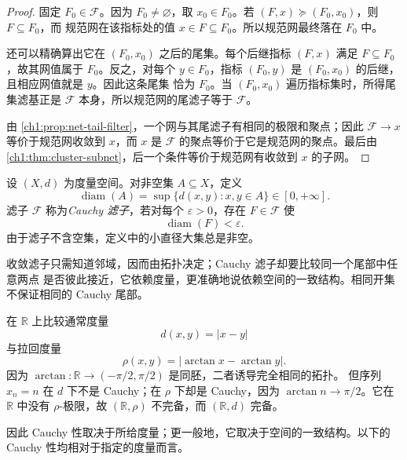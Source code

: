 \begin{proof}
固定 \(F_0\in\mathcal F\)。因为 \(F_0\neq\varnothing\)，取
\(x_0\in F_0\)。若 \((F,x)\succeq(F_0,x_0)\)，则 \(F\subseteq F_0\)，而
规范网在该指标处的值 \(x\in F\subseteq F_0\)。所以规范网最终落在
\(F_0\) 中。

还可以精确算出它在 \((F_0,x_0)\) 之后的尾集。每个后继指标 \((F,x)\) 满足
\(F\subseteq F_0\)，故其网值属于 \(F_0\)。反之，对每个 \(y\in F_0\)，指标
\((F_0,y)\) 是 \((F_0,x_0)\) 的后继，且相应网值就是 \(y\)。因此这条尾集
恰为 \(F_0\)。当 \((F_0,x_0)\) 遍历指标集时，所得尾集滤基正是
\(\mathcal F\) 本身，所以规范网的尾滤子等于 \(\mathcal F\)。

由 \cref{ch1:prop:net-tail-filter}，一个网与其尾滤子有相同的极限和聚点；因此
\(\mathcal F\to x\) 等价于规范网收敛到 \(x\)，而 \(x\) 是
\(\mathcal F\) 的聚点等价于它是规范网的聚点。最后由
\cref{ch1:thm:cluster-subnet}，后一个条件等价于规范网有收敛到 \(x\) 的子网。
\end{proof}

\begin{definition}
设 \((X,d)\) 为度量空间。对非空集 \(A\subseteq X\)，定义
\[
 \operatorname{diam}(A)=\sup\{d(x,y):x,y\in A\}\in[0,+\infty].
\]
滤子 \(\mathcal F\) 称为\emph{Cauchy 滤子}，若对每个
\(\varepsilon>0\)，存在 \(F\in\mathcal F\) 使
\[
 \operatorname{diam}(F)<\varepsilon.
\]
由于滤子不含空集，定义中的小直径大集总是非空。
\end{definition}

\begin{warningbox}[title={Cauchy 不是纯拓扑概念}]
收敛滤子只需知道邻域，因而由拓扑决定；Cauchy 滤子却要比较同一个尾部中任意两点
是否彼此接近，它依赖度量，更准确地说依赖空间的一致结构。相同开集不保证相同的
Cauchy 尾部。

在 $\mathbb R$ 上比较通常度量
\[
 d(x,y)=|x-y|
\]
与拉回度量
\[
 \rho(x,y)=|\arctan x-\arctan y|.
\]
因为 $\arctan:\mathbb R\to(-\pi/2,\pi/2)$ 是同胚，二者诱导完全相同的拓扑。
但序列 $x_n=n$ 在 $d$ 下不是 Cauchy；在 $\rho$ 下却是 Cauchy，因为
$\arctan n\to\pi/2$。它在 $\mathbb R$ 中没有 $\rho$-极限，故
$(\mathbb R,\rho)$ 不完备，而 $(\mathbb R,d)$ 完备。

因此 Cauchy 性取决于所给度量；更一般地，它取决于空间的一致结构。以下的 Cauchy
性均相对于指定的度量而言。
\end{warningbox}

